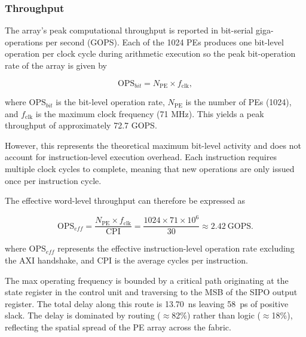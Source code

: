         \subsubsection{Throughput} \label{sec:throughput}
            The array's peak computational throughput is reported in bit-serial giga-operations per second (GOPS). Each of the 1024 PEs produces one bit-level operation per clock cycle during arithmetic execution so the peak bit-operation rate of the array is given by
            
            \begin{equation}
            \text{OPS}_{bit} = N_\text{PE} \times f_\text{clk},
            \end{equation}
            
            where $\text{OPS}_{bit}$ is the bit-level operation rate, $N_\text{PE}$ is the number of PEs (1024), and $f_\text{clk}$ is the maximum clock frequency (71 MHz). This yields a peak throughput of approximately 72.7 GOPS.
            
            However, this represents the theoretical maximum bit-level activity and does not account for instruction-level execution overhead. Each instruction requires multiple clock cycles to complete, meaning that new operations are only issued once per instruction cycle.
            
            The effective word-level throughput can therefore be expressed as
            
            \begin{equation}
            \text{OPS}_{eff} = \frac{N_\text{PE} \times f_\text{clk}}{\text{CPI}} = \frac{1024 \times 71 \times 10^6}{30} \approx 2.42~\text{GOPS}.
            \end{equation}
            
            where $\text{OPS}_{eff}$ represents the effective instruction-level operation rate excluding the AXI handshake, and CPI is the average cycles per instruction.

           The max operating frequency is bounded by a critical path originating at the state register in the control unit and traversing to the MSB of the SIPO output register. The total delay along this route is 13.70~ns leaving 58~ps of positive slack. The delay is dominated by routing ($\approx$82\%) rather than logic ($\approx$18\%), reflecting the spatial spread of the PE array across the fabric.

    
